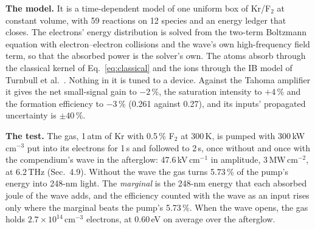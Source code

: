\documentclass[11pt]{article}
\newcommand{\Ft}{F\ensuremath{_2}}
\begin{document}
\textbf{The model.} It is a time-dependent model of one uniform box of Kr/\Ft{} at constant
volume, with 59 reactions on 12 species and an energy ledger that closes. The electrons'
energy distribution is solved from the two-term Boltzmann equation with electron--electron
collisions \cite{HP2005} and the wave's own high-frequency field term, so that the absorbed power
is the solver's own. The atoms absorb through the classical kernel of Eq.~\eqref{eq:classical} and the ions
through the IB model of Turnbull et al.\ \cite{Turnbull2023,Turnbull2024}. Nothing in it is
tuned to a device. Against the Tahoma amplifier it gives the net small-signal gain to $-2$\,\%,
the saturation intensity to $+4$\,\% and the formation efficiency to $-3$\,\% (0.261 against
0.27), and its inputs' propagated uncertainty is $\pm40$\,\%.

\textbf{The test.} The gas, 1\,atm of Kr with 0.5\,\% \Ft{} at 300\,K, is pumped with
300\,kW\,cm$^{-3}$ put into its electrons for 1\,\textmu s and followed to 2\,\textmu s, once
without and once with the compendium's wave in the afterglow: 47.6\,kV\,cm$^{-1}$ in amplitude,
3\,MW\,cm$^{-2}$, at 6.2\,THz (Sec.~4.9). Without the wave the gas turns 5.73\,\% of the pump's
energy into 248-nm light. The \emph{marginal} is the 248-nm energy that each absorbed joule of
the wave adds, and the efficiency counted with the wave as an input rises only where the
marginal beats the pump's 5.73\,\%. When the wave opens, the gas holds
$2.7\times10^{14}$\,cm$^{-3}$ electrons, at 0.60\,eV on average over the afterglow.
\end{document}
